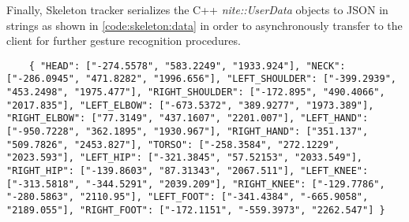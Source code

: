 Finally, Skeleton tracker serializes the C++ \textit{nite::UserData} objects to JSON in strings as shown in \ref{code:skeleton:data} in order to asynchronously transfer to the client for further gesture recognition procedures. 
\begin{lstlisting}
	{ "HEAD": ["-274.5578", "583.2249", "1933.924"], "NECK": ["-286.0945", "471.8282", "1996.656"], "LEFT_SHOULDER": ["-399.2939", "453.2498", "1975.477"], "RIGHT_SHOULDER": ["-172.895", "490.4066", "2017.835"], "LEFT_ELBOW": ["-673.5372", "389.9277", "1973.389"], "RIGHT_ELBOW": ["77.3149", "437.1607", "2201.007"], "LEFT_HAND": ["-950.7228", "362.1895", "1930.967"], "RIGHT_HAND": ["351.137", "509.7826", "2453.827"], "TORSO": ["-258.3584", "272.1229", "2023.593"], "LEFT_HIP": ["-321.3845", "57.52153", "2033.549"], "RIGHT_HIP": ["-139.8603", "87.31343", "2067.511"], "LEFT_KNEE": ["-313.5818", "-344.5291", "2039.209"], "RIGHT_KNEE": ["-129.7786", "-280.5863", "2110.95"], "LEFT_FOOT": ["-341.4384", "-665.9058", "2189.055"], "RIGHT_FOOT": ["-172.1151", "-559.3973", "2262.547"] } 
\end{lstlisting}
\label{code:skeleton:data} 
